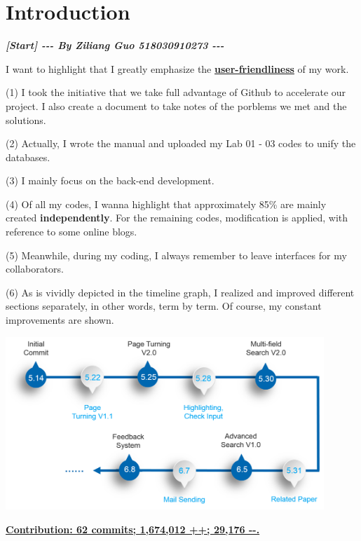 \documentclass[10pt,twoside,a4paper,titlepage]{article}
\begin{document}
		


\newpage



	\section{Introduction}
		\textbf{\emph{[Start] -{}-{}- By Ziliang Guo 518030910273 -{}-{}-}}\newline\par
		I want to highlight that I greatly emphasize the \textbf{\underline{user-friendliness}} of my work.\par
		(1) I took the initiative that we take full advantage of Github to accelerate our project. I also create a document to take notes of the porblems we met and the solutions.\newline\par
		(2) Actually, I wrote the manual and uploaded my Lab 01 - 03 codes to unify the databases.\newline\par
		(3)	I mainly focus on the back-end development.\newline\par
		(4) Of all my codes, I wanna highlight that approximately 85\% are mainly created \textbf{independently}. For the remaining codes, modification is applied, with reference to some online blogs.\newline\par
		(5) Meanwhile, during my coding, I always remember to leave interfaces for my collaborators.\newline\par
		(6)	As is vividly depicted in the timeline graph, I realized and improved different sections separately, in other words, term by term. Of course, my constant improvements are shown.\newline\par
		\includegraphics[width=0.9\textwidth]{gzl/01.png}\newline\par
		\underline{\textbf{Contribution: 62 commits; 1,674,012 ++; 29,176 -{}-.}}
\end{document}
